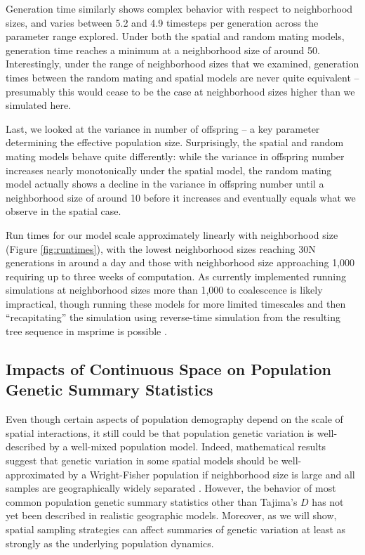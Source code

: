 \documentclass[10pt,twoside,lineno,hidelinks]{preprint}
\begin{document}
Generation time similarly shows complex behavior with respect to neighborhood sizes, and varies between 5.2 and 4.9 timesteps per generation across the parameter range explored. 
Under both the spatial and random mating models, 
generation time reaches a minimum at a neighborhood size of around 50. 
Interestingly, under the range of neighborhood sizes that we examined, generation times between the random mating and spatial models are never quite equivalent -- presumably this would cease to be the case at neighborhood sizes higher than we simulated here.

Last, we looked at the variance in number of offspring -- a key parameter determining the effective population size. 
Surprisingly, the spatial and random mating models behave quite differently: 
while the variance in offspring number increases nearly monotonically under the spatial model, the random mating model actually shows a decline in the variance in offspring number until a neighborhood size of around 10 before it increases and eventually equals what we observe in the spatial case. 

Run times for our model scale approximately linearly with neighborhood size (Figure \ref{fig:runtimes}), with the lowest neighborhood sizes reaching 30N generations in around a day and those with neighborhood size approaching 1,000 requiring up to three weeks of computation. As currently implemented running simulations at neighborhood sizes more than 1,000 to coalescence is likely impractical, though running these models for more limited timescales and then ``recapitating'' the simulation using reverse-time simulation from the resulting tree sequence in msprime is possible \citep{haller2019treesequence}.  


\subsection{Impacts of Continuous Space on Population Genetic Summary Statistics}

Even though certain aspects of population demography depend on the scale of spatial interactions, it still could be that population genetic variation is well-described by a well-mixed population model. Indeed, mathematical results suggest that genetic variation in some spatial models should be well-approximated by a Wright-Fisher population if neighborhood size is large and all samples are geographically widely separated \citep{wilkins2004separation,zahle2005stepping}. However, the behavior of most common population genetic summary statistics other than Tajima's $D$ \citep{Stadler2009} has not yet been described in realistic geographic models. Moreover, as we will show, spatial sampling strategies can affect summaries of genetic variation at least as strongly as the underlying population dynamics. 
\end{document}
